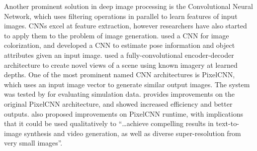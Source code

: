 \documentclass{article}
\begin{document}
Another prominent solution in deep image processing is
the Convolutional Neural Network, which uses filtering operations
in parallel to learn features of input images.
CNNs excel at feature extraction, however researchers have also started to
apply them to the problem of image generation.
\cite{deep_colorization} used a CNN for image colorization, and
\cite{posecnn} developed a CNN to estimate pose information
and object attributes given an input image.
\cite{multiplane} used a fully-convolutional encoder-decoder architecture to
create novel views of a scene using known imagery at learned depths.
One of the most prominent named CNN architectures is PixelCNN,
which uses an input image vector to generate similar output images.
The system was tested by \cite{comparing_simulations} for evaluating simulation
data. \cite{pixelcnn++} provides improvements on the original
PixelCNN architecture, and showed increased efficiency and better outputs.
\cite{parallel_multiscale} also proposed improvements on PixelCNN runtime,
with implications that it could be used qualitatively to
``\dots achieve compelling results in text-to-image synthesis and
video generation, as well as diverse super-resolution from very small images''.
\end{document}

